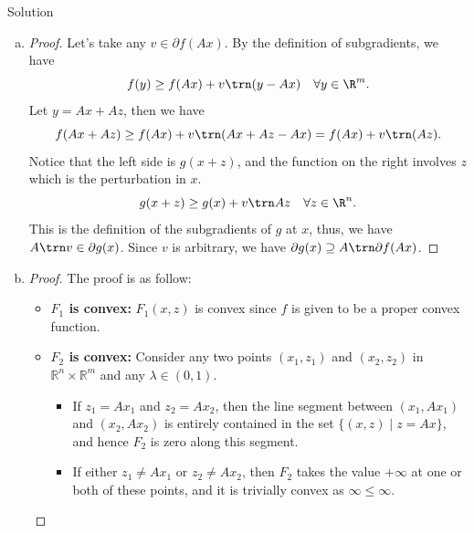 \documentclass{article}
\theoremstyle{plain}
\theoremstyle{definition}
\theoremstyle{remark}
\begin{document}
\begin{solution}
    {Solution}
    \begin{enumerate}[(a)]
        \item {
            \begin{proof}
                Let's take any $v\in\partial f(Ax)$. By the definition of subgradients, we have
                \[
                    f(y)\geq f(Ax)+v\trn(y-Ax) \quad \forall y\in\R^m.
                \]
                Let $y=Ax+Az$, then we have
                \[
                    f(Ax+Az)\geq f(Ax)+v\trn(Ax+Az-Ax)=f(Ax)+v\trn(Az).
                \]
                Notice that the left side is $g(x+z)$, and the function on the right involves $z$ which is the perturbation in $x$.
                \[
                    g(x+z)\geq g(x)+v\trn Az \quad \forall z\in\R^n.
                \]
                This is the definition of the subgradients of $g$ at $x$, thus, we have $A\trn v\in\partial g(x)$. Since $v$ is arbitrary, we have $\partial g(x)\supseteq A\trn\partial f(Ax)$.
            \end{proof}
        }
        \item {
            \begin{proof}
                The proof is as follow:
                \begin{itemize}
                    \item \textbf{\( F_1 \) is convex:}
                    \( F_1(x,z) \) is convex since \( f \) is given to be a proper convex function.

                    \item \textbf{\( F_2 \) is convex:}
                    Consider any two points \( (x_1, z_1) \) and \( (x_2, z_2) \) in \( \mathbb{R}^n \times \mathbb{R}^m \) and any \( \lambda \in (0,1) \).
                    \begin{itemize}
                        \item If \( z_1 = Ax_1 \) and \( z_2 = Ax_2 \), then the line segment between \( (x_1, Ax_1) \) and \( (x_2, Ax_2) \) is entirely contained in the set \( \{ (x,z) \mid z = Ax \} \), and hence \( F_2 \) is zero along this segment.

                        \item If either \( z_1 \neq Ax_1 \) or \( z_2 \neq Ax_2 \), then \( F_2 \) takes the value \( +\infty \) at one or both of these points, and it is trivially convex as \( \infty \leq \infty \).
                    \end{itemize}


\end{itemize}
\end{proof}}
\end{enumerate}
\end{solution}
\end{document}

